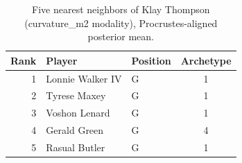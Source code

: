 \begin{table}[htbp]
  \centering\small
  \begin{tabular}{rllc}
    \toprule
    Rank & Player & Position & Archetype \\
    \midrule
    1 & Lonnie Walker IV & G & 1 \\
    2 & Tyrese Maxey & G & 1 \\
    3 & Voshon Lenard & G & 1 \\
    4 & Gerald Green & G & 4 \\
    5 & Rasual Butler & G & 1 \\
    \bottomrule
  \end{tabular}
  \caption{Five nearest neighbors of Klay Thompson (curvature_m2 modality), Procrustes-aligned posterior mean.}
  \label{tab:Klay_Thompson_neighbors_curvature_m2}
\end{table}


